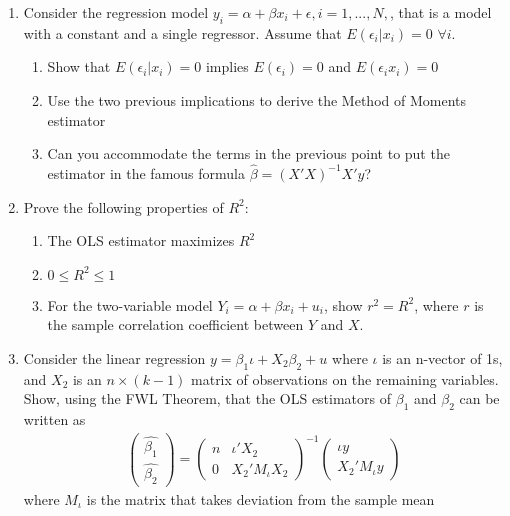 \documentclass[12pt,onecolumn]{article}
\begin{document}
\begin{enumerate}
  \item Consider the regression model $y_i = \alpha +\beta x_i +\epsilon, i=1,...,N,$, that is a model with a constant and a single regressor. Assume that $E(\epsilon_i|x_i)=0$ $\forall i$.
      \begin{enumerate}
        \item Show that $E(\epsilon_i|x_i)=0$ implies  $E(\epsilon_i)=0$ and  $E(\epsilon_i x_i)=0$
        \item Use the two previous implications to derive the Method of Moments estimator
        \item Can you accommodate the terms in the previous point to put the estimator in the famous formula $\hat \beta= (X'X)^{-1}X'y$?
      \end{enumerate}
  \item Prove the following properties of $R^2$:
        \begin{enumerate}
              \item The OLS estimator maximizes $R^2$
              \item $0 \leq R^2 \leq 1$
              \item For the two-variable model $Y_i = \alpha + \beta x_i + u_i$, show $r^2 = R^2$, where $r$ is the sample correlation coefficient between $Y$ and $X$.
    \end{enumerate}
    
    
  \item Consider the linear regression $y = \beta_1 \iota + X_2 \beta_2 +u$ where $\iota$ is an n-vector of 1s, and $X_2$ is an $n \times (k-1)$ matrix of observations on the remaining variables. Show, using the FWL Theorem, that the OLS estimators of $\beta_1$ and $\beta_2$ can be written as
  \begin{align}
  \left(\begin{array}{c}
    \hat{\beta_{1}}\\
    \hat{\beta_{2}}
    \end{array}\right)=\left(\begin{array}{cc}
    n & \iota'X_{2}\\
    0 & X_{2}'M_{\iota}X_{2}
    \end{array}\right)^{-1}\left(\begin{array}{c}
    \iota y\\
    X_{2}'M_{\iota}y
    \end{array}\right)
  \end{align}
  where $M_{\iota}$ is the matrix that takes deviation from the sample mean


\end{enumerate}
\end{document}
